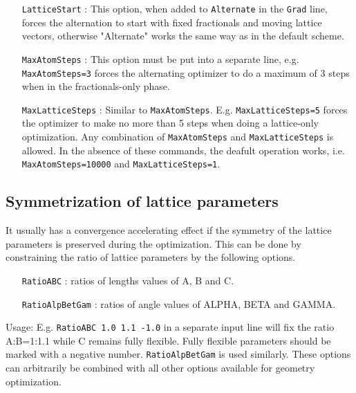 \documentclass[prl,aps,preprint,superbib,12pt]{revtex4}
\begin{document}
\begin{itemize}
\item[{\tt LatticeStart}] :
This option, when added to {\tt Alternate} in the {\tt Grad} line,
forces the alternation to start with fixed fractionals and moving
lattice vectors, otherwise "Alternate" works the same way as in the 
default scheme.
\end{itemize}

\begin{itemize}
\item[{\tt MaxAtomSteps}] :
This option must be put into a separate line, e.g. {\tt MaxAtomSteps=3}
forces the alternating optimizer to do a maximum of 3 steps 
when in the fractionals-only phase.    
\end{itemize}

\begin{itemize}
\item[{\tt MaxLatticeSteps}] :
Similar to {\tt MaxAtomSteps}. E.g. {\tt MaxLatticeSteps=5} forces the optimizer
to make no more than 5 steps when doing a lattice-only optimization.
Any combination of {\tt MaxAtomSteps} and {\tt MaxLatticeSteps} is allowed.
In the absence of these commands, the deafult operation works, i.e.
{\tt MaxAtomSteps=10000} and {\tt MaxLatticeSteps=1}.
\end{itemize}

\subsection{Symmetrization of lattice parameters}
It usually has a convergence accelerating effect if the symmetry of the
lattice parameters is preserved during the optimization.
This can be done by constraining the ratio of lattice parameters
by the following options.
\begin{itemize}
\item[{\tt RatioABC}] : ratios of lengths values of A, B and C.
\item[{\tt RatioAlpBetGam}] : ratios of angle values of ALPHA, 
BETA and GAMMA.
\end{itemize}
Usage: E.g. {\tt RatioABC 1.0 1.1 -1.0} in a separate input line
will fix the ratio A:B=1:1.1 while C remains fully flexible. 
Fully flexible parameters should be marked with a negative number.
{\tt RatioAlpBetGam} is used similarly.
These options can arbitrarily be combined with all other options 
available for geometry optimization.
\end{document}
